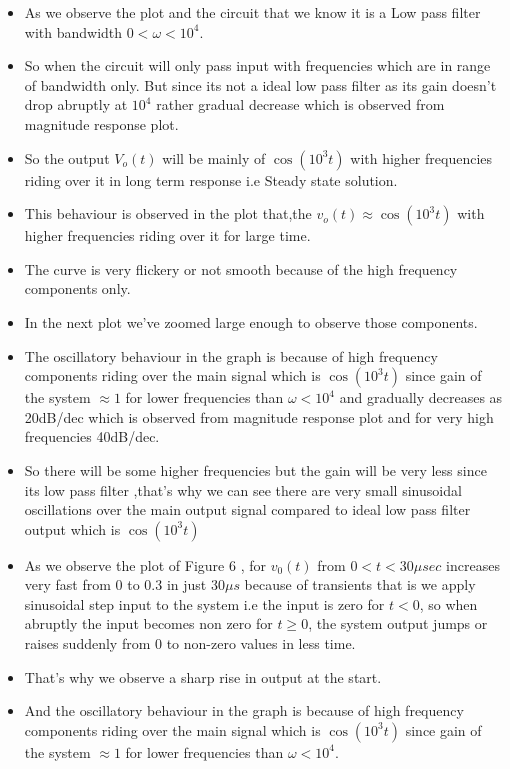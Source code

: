 \documentclass[11pt, a4paper]{article}
\begin{document}
\begin{itemize}
\item
  As we observe the plot and the circuit that we know it is a Low pass
  filter with bandwidth \(0< \omega < 10^4\).
\item
  So when the circuit will only pass input with frequencies which are in
  range of bandwidth only. But since its not a ideal low pass filter as
  its gain doesn't drop abruptly at \(10^4\) rather gradual decrease
  which is observed from magnitude response plot.
\item
  So the output \(V_o(t)\) will be mainly of \(\cos(10^{3}t)\) with
  higher frequencies riding over it in long term response i.e Steady
  state solution.
\item
  This behaviour is observed in the plot that,the
  \(v_o(t) \approx \cos(10^{3}t)\) with higher frequencies riding over
  it for large time.
\item
  The curve is very flickery or not smooth because of the high frequency
  components only.
\item
  In the next plot we've zoomed large enough to observe those components.
\end{itemize}
\begin{itemize}
  \item
    The oscillatory behaviour in the graph is because of high frequency
    components riding over the main signal which is \(\cos(10^{3}t)\)
    since gain of the system \(\approx 1\) for lower frequencies than
    \(\omega < 10^4\) and gradually decreases as 20dB/dec which is
    observed from magnitude response plot and for very high frequencies
    40dB/dec.
  \item
    So there will be some higher frequencies but the gain will be very
    less since its low pass filter ,that's why we can see there are very
    small sinusoidal oscillations over the main output signal compared to
    ideal low pass filter output which is \(\cos(10^{3}t)\)
  \end{itemize}
  \begin{itemize}
    \item
      As we observe the plot of Figure 6 , for \(v_0(t)\) from
      \(0<t<30\mu sec\) increases very fast from 0 to 0.3 in just
      \(30\mu s\) because of transients that is we apply sinusoidal step
      input to the system i.e the input is zero for \(t<0\), so when
      abruptly the input becomes non zero for \(t \geq 0\), the system
      output jumps or raises suddenly from 0 to non-zero values in less
      time.
    \item
      That's why we observe a sharp rise in output at the start.
    \item
      And the oscillatory behaviour in the graph is because of high
      frequency components riding over the main signal which is
      \(\cos(10^{3}t)\) since gain of the system \(\approx 1\) for lower
      frequencies than \(\omega < 10^4\).
    \end{itemize}
\end{document}
